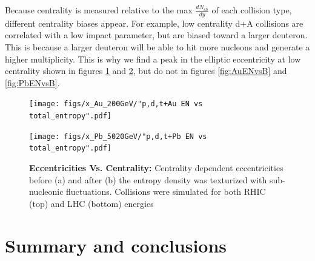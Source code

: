 \documentclass[preprint,showpacs,amsfonts,aps,prl,nofootinbib,floatfix]{revtex4}
\begin{document}
Because centrality is measured relative to the max $\frac{dN_{ch}}{dy}$ of each collision type, different centrality biases appear. For example, low centrality d+A collisions are correlated with a low impact parameter, but are biased toward a larger deuteron. This is because a larger deuteron will be able to hit more nucleons and generate a higher multiplicity. This is why we find a peak in the elliptic eccentricity at low centrality shown in figures \ref{fig:AuENvsCent} and \ref{fig:PbENvsCent}, but do not in figures \ref{fig:AuENvsB} and \ref{fig:PbENvsB}.
\begin{figure}[ht]
	\centering
	\texttt{[image: figs/x\_Au\_200GeV/"p,d,t+Au EN vs total\_entropy".pdf]}
	\caption{}
	\label{fig:AuENvsCent}
\end{figure} 
\begin{figure}[ht]
	\centering
	\texttt{[image: figs/x\_Pb\_5020GeV/"p,d,t+Pb EN vs total\_entropy".pdf]}
	\caption{\textbf{Eccentricities Vs. Centrality:} Centrality dependent eccentricities before (a) and after (b) the entropy density was texturized with sub-nucleonic fluctuations. Collisions were simulated for both RHIC (top) and LHC (bottom) energies}
	\label{fig:PbENvsCent}
\end{figure}

\section{Summary and conclusions}
\label{sec5}




%
%
\end{document}

